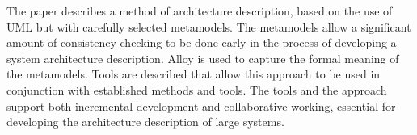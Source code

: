 \fontsize{9}{11}\selectfont 

The paper describes a method of architecture description, based on the use of UML but with carefully selected metamodels. The metamodels allow a significant amount of consistency checking to be done early in the process of developing a system architecture description. Alloy is used to capture the formal meaning of the metamodels. Tools are described that allow this approach to be used in conjunction with established methods and tools. The tools and the approach support both incremental development and collaborative working, essential for developing the architecture description of large systems.

